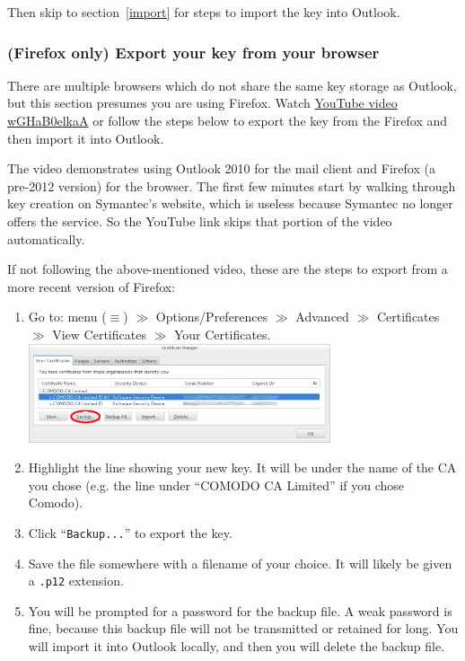 \documentclass[pdftex,12pt,titlepage=false]{scrartcl}
\begin{document}
\vspace{1em}
Then skip to section~\ref{import} for steps to import the key into
Outlook.

\subsubsection{(Firefox only) Export your key from your browser}
There are multiple browsers which do not share the same key storage as
Outlook, but this section presumes you are using Firefox.  Watch
\href{https://www.youtube.com/watch?v=wGHaB0elkaA\&start=226}{YouTube
  video wGHaB0elkaA} or follow the steps below to export the key from
the Firefox and then import it into Outlook.

The video demonstrates using Outlook 2010 for the mail client and
Firefox (a pre-2012 version) for the browser.  The first few minutes
start by walking through key creation on Symantec's website, which is
useless because Symantec no longer offers the service.  So the YouTube
link skips that portion of the video automatically.

If not following the above-mentioned video, these are the steps to
export from a more recent version of Firefox:

\begin{enumerate}
  \item Go to: menu ($\equiv$) $\gg$ Options/Preferences $\gg$ Advanced
  $\gg$ Certificates $\gg$ View Certificates $\gg$ Your Certificates.\\[1em]%
  \includegraphics[width=0.7\textwidth]{images/firefox_cert_settings.png}
\item Highlight the line showing your new key.  It will be under the
  name of the CA you chose (e.g. the line under ``COMODO CA Limited''
  if you chose Comodo).
\item %
  Click ``\texttt{Backup...}'' to export the key.
\item Save the file somewhere with a filename of your choice.  It will
  likely be given a \verb|.p12| extension.
\item\label{makebupw} You will be prompted for a password for the
  backup file.  A weak password is fine, because this backup file will
  not be transmitted or retained for long.  You will import it into
  Outlook locally, and then you will delete the backup file.
\end{enumerate}
\end{document}
